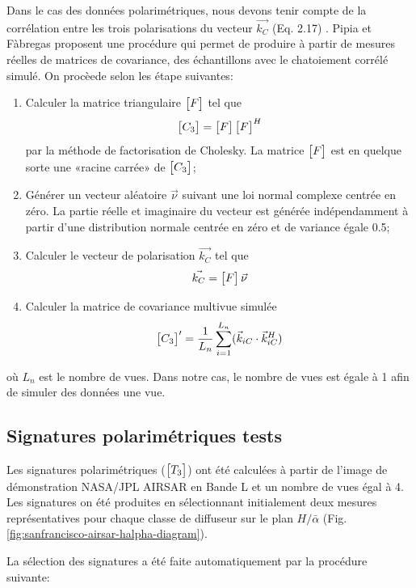 Dans le cas des données polarimétriques, nous devons tenir compte de la corrélation entre les trois polarisations du vecteur $\Vec{k_C}$ (Eq. 2.17) .
Pipia et Fàbregas \cite{PolsarSim} proposent une procédure qui permet de produire à partir de mesures réelles de matrices de covariance, des échantillons avec le chatoiement corrélé simulé. On procèede selon les étape suivantes:
\begin{enumerate}
\item Calculer la matrice triangulaire $\begin{bmatrix} F \end{bmatrix}$ tel que 
\begin{equation}
     \begin{bmatrix} C_3 \end{bmatrix} = \begin{bmatrix} F \end{bmatrix}\begin{bmatrix} F \end{bmatrix}^{H}
\end{equation}
par la méthode de factorisation de Cholesky. La matrice $\begin{bmatrix} F \end{bmatrix}$ est en quelque sorte une «racine carrée» de $\begin{bmatrix} C_3 \end{bmatrix}$;
\item Générer un vecteur aléatoire $\Vec{\nu}$ suivant une loi normal complexe centrée en zéro.  La partie réelle et imaginaire du vecteur est générée indépendamment à partir d'une distribution normale centrée en zéro et de variance égale 0.5;
\item Calculer le vecteur de polarisation $\Vec{k_C}$ tel que
\begin{equation}
    \Vec{k_C}=\begin{bmatrix} F \end{bmatrix}\Vec{\nu}
\end{equation}
\item Calculer la matrice de covariance multivue simulée
 \begin{equation}
\begin{bmatrix} C_3 \end{bmatrix}^{\prime} = \frac{1}{L_n} \sum_{i=1}^{L_n}(\Vec{k}_{iC} \cdot \Vec{k}_{iC}^{H})
 \end{equation}
\end{enumerate}

où $L_n$ est le nombre de vues.  Dans notre cas, le nombre de vues est égale à 1 afin de simuler des données une vue.

\subsection{Signatures polarimétriques tests}

Les signatures polarimétriques ($\begin{bmatrix} T_3 \end{bmatrix}$) ont été calculées à partir de l'image de démonstration NASA/JPL AIRSAR en Bande L et un nombre de vues égal à 4.  Les signatures on été produites en sélectionnant initialement deux mesures représentatives pour chaque classe de diffuseur sur le plan $H/\bar{\alpha}$ (Fig. \ref{fig:sanfrancisco-airsar-halpha-diagram}).

La sélection des signatures a été faite automatiquement par la procédure suivante:

